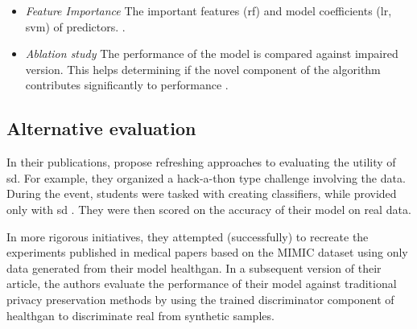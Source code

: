 \begin{itemize}
                \begin{itemize}
                    \item \textsl{Feature Importance} The important features (\gls{rf}) and model coefficients (\gls{lr}, \gls{svm}) of predictors. \cite{esteban2017real,Xu2019-ay,Yoon2020-anon,chin2019generation, Beaulieu-Jones2019-ct}.
                    \item \textsl{Ablation study}  The performance of the model is compared against impaired version. This helps determining if the novel component of the algorithm contributes significantly to performance \cite{cui2019conan, Che_2017, mcdermott2018semi, Yoon2018-radial, chincheong2020generation}.
                \end{itemize}
            \end{itemize}
            
                
                
                

    \subsection{Alternative evaluation}
        In their publications, \citeauthor{Yale_2020} propose refreshing approaches to evaluating the utility of \gls{sd}. For example, they organized a hack-a-thon type challenge involving the data. During the event, students were tasked with creating classifiers, while provided only with \gls{sd} \cite{Yale_2020}. They were then scored on the accuracy of their model on real data.\par
        In more rigorous initiatives, they attempted (successfully) to recreate the experiments published in medical papers based on the MIMIC dataset using only data generated from their model \gls{healthgan}. In a subsequent version of their article, the authors evaluate the performance of their model against traditional privacy preservation methods by using the trained discriminator component of \gls{healthgan} to discriminate real from synthetic samples.
        
